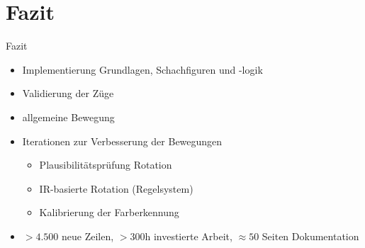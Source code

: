 
\section{Fazit}

\begin{frame}{Fazit}
    \begin{itemize}
        \item Implementierung Grundlagen, Schachfiguren und -logik
        \item Validierung der Züge
        \item allgemeine Bewegung
        \item Iterationen zur Verbesserung der Bewegungen
        \begin{itemize}
            \item Plausibilitätsprüfung Rotation
            \item IR-basierte Rotation (Regelsystem)
            \item Kalibrierung der Farberkennung
        \end{itemize}
        \item $>4.500$ neue Zeilen, $>300$h investierte Arbeit, $\approx50$ Seiten Dokumentation
    \end{itemize}
\end{frame}